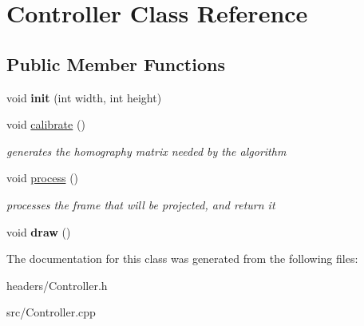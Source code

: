 \hypertarget{class_controller}{\section{Controller Class Reference}
\label{class_controller}
}
\subsection*{Public Member Functions}
\begin{DoxyCompactItemize}
\item 
\hypertarget{class_controller_a53e2dfd2b170b86a607fb23f69c13859}{void {\bfseries init} (int width, int height)}\label{class_controller_a53e2dfd2b170b86a607fb23f69c13859}

\item 
\hypertarget{class_controller_a3281d6167b17007535c5414c5c409b4b}{void \hyperlink{class_controller_a3281d6167b17007535c5414c5c409b4b}{calibrate} ()}\label{class_controller_a3281d6167b17007535c5414c5c409b4b}

\begin{DoxyCompactList}\small\item\em generates the homography matrix needed by the algorithm \end{DoxyCompactList}\item 
\hypertarget{class_controller_a7ac58195c3342b7de52b762c0d759a3c}{void \hyperlink{class_controller_a7ac58195c3342b7de52b762c0d759a3c}{process} ()}\label{class_controller_a7ac58195c3342b7de52b762c0d759a3c}

\begin{DoxyCompactList}\small\item\em processes the frame that will be projected, and return it \end{DoxyCompactList}\item 
\hypertarget{class_controller_a02fdbce18ccb7becaa2aa9fd8fc4aa2b}{void {\bfseries draw} ()}\label{class_controller_a02fdbce18ccb7becaa2aa9fd8fc4aa2b}

\end{DoxyCompactItemize}


The documentation for this class was generated from the following files\-:\begin{DoxyCompactItemize}
\item 
headers/Controller.\-h\item 
src/Controller.\-cpp\end{DoxyCompactItemize}

